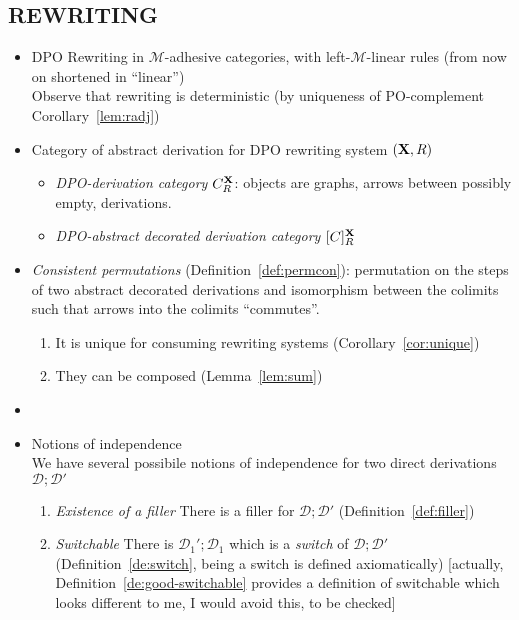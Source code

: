\documentclass[a4paper,UKenglish,cleveref,pdftex,thm-restate,numberwithinsect,anonymous]{lipics}
\newcommand{\dpo}{\textsc{dpo}}
\def\R{\mathsf{R}}
\def\X{\textbf {\textup{X}}}
\newcommand{\dder}[1]{\mathscr{#1}}
\def\dpo{\mathsf{C}^{\X}_R}
\def\dpi{[\mathsf{C}]^{\X}_R}
\begin{document}
\subsection*{REWRITING}
\begin{itemize}
\item DPO Rewriting in $\mathcal{M}$-adhesive categories, with left-$\mathcal{M}$-linear rules (from now on shortened in ``linear'')\\
  Observe that rewriting is deterministic (by uniqueness of
  PO-complement Corollary~\ref{lem:radj})
  
\item Category of abstract derivation for DPO rewriting system $(\X, \R)$
  \begin{itemize}
  \item \emph{DPO-derivation category} $\dpo$: objects are graphs,
    arrows between possibly empty, derivations.
  \item \emph{DPO-abstract decorated derivation category} $\dpi$
  \end{itemize}
  
  
  
\item \emph{Consistent permutations} (Definition~\ref{def:permcon}):
  permutation on the steps of two abstract decorated derivations and
  isomorphism between the colimits such that arrows into the colimits
  ``commutes''.
  \begin{enumerate}
  \item It is unique for consuming
    rewriting systems (Corollary~\ref{cor:unique})
  \item They can be composed
    (Lemma~\ref{lem:sum})
  \end{enumerate}
\item
  
  
\item Notions of independence\\ We have several
  possibile notions of independence for two direct derivations $\dder{D}
  ; \dder{D'}$
  \begin{enumerate}
    
  \item \emph{Existence of a filler} There
is a filler for $\dder{D} ; \dder{D'}$ (Definition~\ref{def:filler})

\item \emph{Switchable} There is
  $\dder{D}_1' ; \dder{D}_1$ which is a \emph{switch} of $\dder{D} ;
  \dder{D'}$ (Definition~\ref{de:switch}, being a switch is defined
  axiomatically) [actually, Definition~\ref{de:good-switchable} provides
  a definition of switchable which looks different to me, I would avoid
  this, to be checked]
  

\end{enumerate}
\end{itemize}
\end{document}
